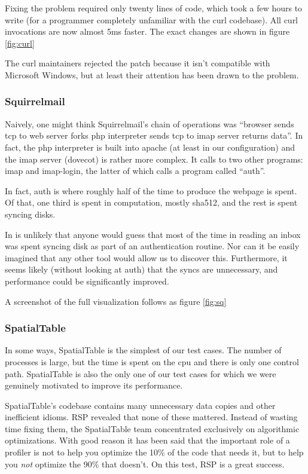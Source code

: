 \documentclass[10pt]{article}
\begin{document}
Fixing the problem required only twenty lines of code, which took a few hours to write (for a programmer completely unfamiliar with the curl codebase).  All curl invocations are now almost 5ms faster.  The exact changes are shown in figure \ref{fig:curl}

The curl maintainers rejected the patch because it isn't compatible with Microsoft Windows, but at least their attention has been drawn to the problem.

\subsubsection{Squirrelmail}

Naively, one might think Squirrelmail's chain of operations was ``browser sends tcp to web server forks php interpreter sends tcp to imap server returns data''.  In fact, the php interpreter is built into apache (at least in our configuration) and the imap server (dovecot) is rather more complex.  It calls to two other programs: imap and imap-login, the latter of which calls a program called ``auth''.

In fact, auth is where roughly half of the time to produce the webpage is spent.  Of that, one third is spent in computation, mostly sha512, and the rest is spent syncing disks.

In is unlikely that anyone would guess that most of the time in reading an inbox was spent syncing disk as part of an authentication routine.  Nor can it be easily imagined that any other tool would allow us to discover this.  Furthermore, it seems likely (without looking at auth) that the syncs are unnecessary, and performance could be significantly improved.

A screenshot of the full visualization follows as figure \ref{fig:sq}

\subsubsection{SpatialTable}

In some ways, SpatialTable is the simplest of our test cases.  The number of processes is large, but the time is spent on the cpu and there is only one control path.  SpatialTable is also the only one of our test cases for which we were genuinely motivated to improve its performance.

SpatialTable's codebase contains many unnecessary data copies and other inefficient idioms.  RSP revealed that none of these mattered.  Instead of wasting time fixing them, the SpatialTable team concentrated exclusively on algorithmic optimizations.  With good reason it has been said that the important role of a profiler is not to help you optimize the 10\% of the code that needs it, but to help you \emph{not} optimize the 90\% that doesn't\cite{taoup}.  On this test, RSP is a great success.
\end{document}
